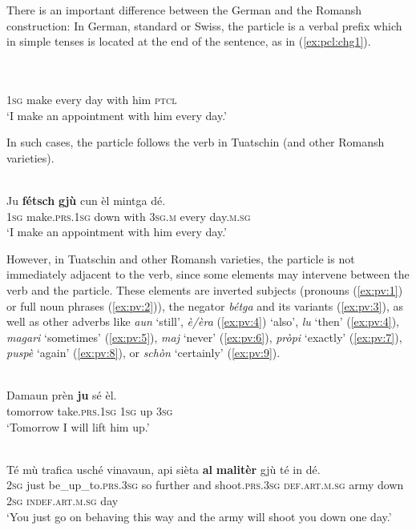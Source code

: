 There is an important difference between the German and the Romansh construction: In German, standard or Swiss, the particle is a verbal prefix which in simple tenses is located at the end of the sentence, as in (\ref{ex:pcl:chg1}).

\ea\label{ex:pcl:chg1}
\\
\\
     \textsc{1sg}  make every day with him  \textsc{ptcl} \\
\glt `I make an appointment with him every day.'
\z

In such cases, the particle follows the verb in Tuatschin (and other Romansh varieties).

\ea\label{}
\\
\gll  Ju \textbf{fétsch} \textbf{gjù} cun èl mintga dé.\\
     \textsc{1sg}  make.\textsc{prs.1sg}  down with \textsc{3sg.m}  every day.\textsc{m.sg}\\
\glt `I make an appointment with him every day.'
\z

However, in Tuatschin and other Romansh varieties, the particle is not immediately adjacent to the verb, since some elements may intervene between the verb and the particle. These elements are inverted subjects (pronouns (\ref{ex:pv:1}) or full noun phrases (\ref{ex:pv:2})), the negator \textit{bétga} and its variants (\ref{ex:pv:3}), as well as other adverbs like \textit{aun} `still', \textit{è/èra} (\ref{ex:pv:4}) `also', \textit{lu} `then' (\ref{ex:pv:4}), \textit{magari} `sometimes' (\ref{ex:pv:5}), \textit{maj} `never' (\ref{ex:pv:6}), \textit{pròpi} `exactly' (\ref{ex:pv:7}), \textit{puspè} `again' (\ref{ex:pv:8}), or \textit{schòn} `certainly' (\ref{ex:pv:9}).

\ea\label{ex:pv:1}
\\
\gll   Damaun prèn \textbf{ju} sé èl.\\
     tomorrow take.\textsc{prs.1sg} \textsc{1sg} up \textsc{3sg}\\
\glt `Tomorrow I will lift him up.'
\z

\ea\label{ex:pv:2}
\\
\gll  Té mù trafica usché vinavaun, api sièta \textbf{al} \textbf{malitèr} gjù té in dé.\\
     \textsc{2sg} just be\_up\_to.\textsc{prs.3sg} so further and shoot.\textsc{prs.3sg} \textsc{def.art.m.sg} army down \textsc{2sg} \textsc{indef.art.m.sg} day\\
\glt `You just go on behaving this way and the army will shoot you down one day.' 
\z

